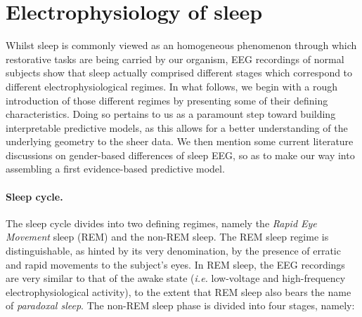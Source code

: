 \section{Electrophysiology of sleep}

Whilst sleep is commonly viewed as an homogeneous phenomenon through which restorative tasks are being carried by our organism, EEG recordings of normal subjects show that sleep actually comprised different stages which correspond to different electrophysiological regimes. In what follows, we begin with a rough introduction of those different regimes by presenting some of their defining characteristics. Doing so pertains to us as a paramount step toward building interpretable predictive models, as this allows for a better understanding of the underlying geometry to the sheer data.  We then mention some current literature discussions on gender-based differences of sleep EEG, so as to make our way into assembling a first evidence-based predictive model.
\\
\paragraph{Sleep cycle.} The sleep cycle divides into two defining regimes, namely the \emph{Rapid Eye Movement} sleep (REM) and the non-REM sleep. The REM sleep regime is distinguishable, as hinted by its very denomination, by the presence of erratic and rapid movements to the subject's eyes. In REM sleep, the EEG recordings are very similar to that of the awake state (\emph{i.e.} low-voltage and high-frequency electrophysiological activity), to the extent that REM sleep also bears the name of \emph{paradoxal sleep}. The non-REM sleep phase is divided into four stages, namely:

